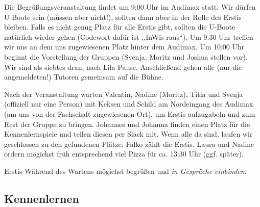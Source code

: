 \documentclass[10pt,twocolumn,ngerman]{scrartcl}
\begin{document}
Die Begrüßungsveranstaltung findet um 9:00 Uhr im Audimax statt. Wir
dürfen U-Boote sein (müssen aber nicht!), sollten dann aber in der
Rolle des Erstis bleiben. Falls es nicht genug Platz für alle Erstis
gibt, sollten die U-Boote natürlich wieder gehen (Codewort dafür ist
,,InWis raus``). Um 9:30 Uhr treffen wir uns an dem uns zugewiesenen
Platz hinter dem Audimax. Um 10:00 Uhr beginnt die Vorstellung der
Gruppen (Svenja, Moritz und Joshua stellen vor). Wir sind als siebtes
dran, nach Lila Pause. Anschließend gehen alle (nur die angemeldeten!)
Tutoren gemeinsam auf die Bühne.

Nach der Veranstaltung warten Valentin, Nadine (Moritz), Titia und
Svenja (offiziell nur eine Person) mit Keksen und Schild am Nordeingang
des Audimax (am uns von der Fachschaft zugewiesenen Ort), um Erstis
aufzugabeln und zum Rest der Gruppe zu bringen. Johannes und Johanna
finden einen Platz für die Kennenlernspiele und teilen diesen per
Slack mit. Wenn alle da sind, laufen wir geschlossen zu den gefundenen
Plätze. Falko zählt die Erstis. Laura und Nadine ordern mögichst
früh entsprechend viel Pizza für ca. 13:30 Uhr (ggf. später).

Erstis Während des Wartens mögichst begrüßen und \emph{in Gespräche
einbinden}.

\subsection{Kennenlernen}
\end{document}
